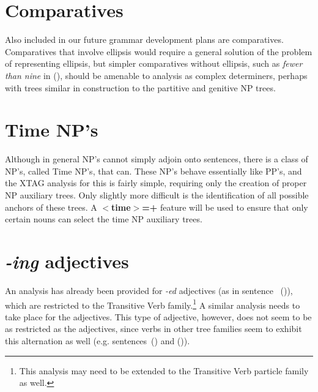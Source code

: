 \section{Comparatives}

Also included in our future grammar development plans are comparatives.
Comparatives that involve ellipsis would require a general solution of the
problem of representing ellipsis, but simpler comparatives without ellipsis,
such as {\it fewer than nine\/} in (), should be amenable to analysis as
complex determiners, perhaps with trees similar in construction to the
partitive and genitive NP trees.




\section{Time NP's}

Although in general NP's cannot simply adjoin onto sentences, there is a class
of NP's, called Time NP's, that can.  These NP's behave essentially like PP's,
and the XTAG analysis for this is fairly simple, requiring only the creation of
proper NP auxiliary trees.  Only slightly more difficult is the identification
of all possible anchors of these trees.  A {\bf $<$time$>$=+} feature will be
used to ensure that only certain nouns can select the time NP auxiliary trees.




\section{{\it -ing} adjectives}

An analysis has already been provided for {\it -ed} adjectives (as in sentence~
()), which are restricted to the Transitive Verb family.\footnote{This
analysis may need to be extended to the Transitive Verb particle family as
well.}  A similar analysis needs to take place for the  adjectives.  This type of adjective, however, does not seem to be as
restricted as the  adjectives, since verbs in other
tree families seem to exhibit this alternation as well (e.g. sentences~()
and ()).




